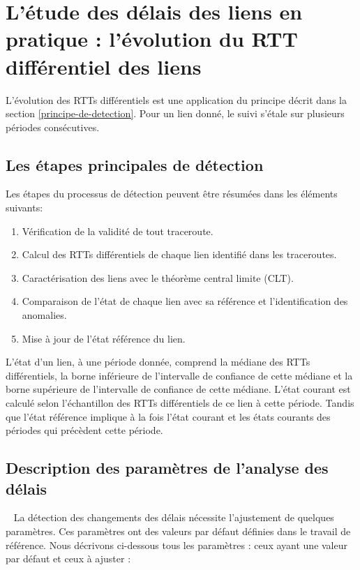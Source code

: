 \section{L'étude des délais des liens en pratique : l'évolution du RTT différentiel des liens}

L'évolution des RTTs différentiels est une  application du principe décrit dans la section  \ref{principe-de-detection}. Pour un lien donné, le suivi s'étale sur plusieurs  périodes consécutives.  

\subsection{Les étapes principales de détection} \label{steps:detection}
Les étapes du processus de détection peuvent être résumées dans les éléments suivants:

\begin{enumerate}[label=(\roman*)]
	
	\item Vérification de la validité de tout traceroute.
	
	\item Calcul des RTTs différentiels de chaque lien identifié dans les traceroutes.
	
	\item Caractérisation des liens avec le théorème central limite (CLT).
	
	\item  Comparaison de l'état de chaque lien avec sa référence  et l'identification des anomalies.
	
	\item Mise à jour de l'état référence du lien.
\end{enumerate}

L'état d'un lien, à une période donnée,  comprend la médiane des RTTs différentiels, la borne inférieure de l'intervalle de confiance de cette médiane et  la borne supérieure de l'intervalle de confiance de cette médiane.  L'état courant est calculé selon l'échantillon des RTTs différentiels de ce lien à cette période. Tandis que l'état référence implique à la fois l'état courant et les états courants des périodes qui précèdent cette période.

\subsection{Description des paramètres de l'analyse des délais} \label{par:parametre-de-lanalyse}~
La détection des changements des délais nécessite l'ajustement de quelques paramètres. Ces paramètres ont des valeurs par défaut  définies dans le travail de référence. Nous décrivons ci-dessous tous les paramètres : ceux ayant une valeur par défaut et ceux à ajuster :

